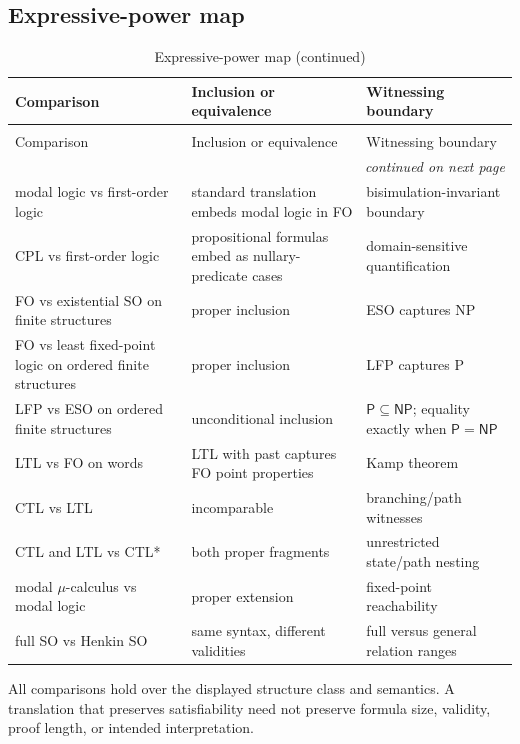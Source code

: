 \subsection{Expressive-power map}
\label{sec:p14-expressive-table}

\begin{longtable}{@{}p{}p{}p{}@{}}
\caption{Expressive-power map}\\
\toprule
Comparison & Inclusion or equivalence & Witnessing boundary \\
\midrule
\endfirsthead
\caption[]{Expressive-power map (continued)}\\
\toprule
Comparison & Inclusion or equivalence & Witnessing boundary \\
\midrule
\endhead
\midrule\multicolumn{3}{r}{\emph{continued on next page}}\\
\endfoot
\endlastfoot
modal logic vs first-order logic & standard translation embeds modal logic in FO & bisimulation-invariant boundary \cite{VanBenthem1983} \\
CPL vs first-order logic & propositional formulas embed as nullary-predicate cases & domain-sensitive quantification \cite{Enderton2001} \\
FO vs existential SO on finite structures & proper inclusion & ESO captures NP \cite{Fagin1974} \\
FO vs least fixed-point logic on ordered finite structures & proper inclusion & LFP captures P \cite{Immerman1986} \\
LFP vs ESO on ordered finite structures & unconditional inclusion & \(\mathsf P\subseteq\mathsf{NP}\); equality exactly when \(\mathsf P=\mathsf{NP}\) \cite{Immerman1999} \\
LTL vs FO on words & LTL with past captures FO point properties & Kamp theorem \cite{Kamp1968} \\
CTL vs LTL & incomparable & branching/path witnesses \cite{EmersonHalpern1986} \\
CTL and LTL vs CTL* & both proper fragments & unrestricted state/path nesting \cite{EmersonHalpern1986} \\
modal \(\mu\)-calculus vs modal logic & proper extension & fixed-point reachability \cite{Kozen1983} \\
full SO vs Henkin SO & same syntax, different validities & full versus general relation ranges \cite{Henkin1950,Shapiro1991} \\
\bottomrule
\end{longtable}

All comparisons hold over the displayed structure class and semantics. A
translation that preserves satisfiability need not preserve formula size,
validity, proof length, or intended interpretation.
